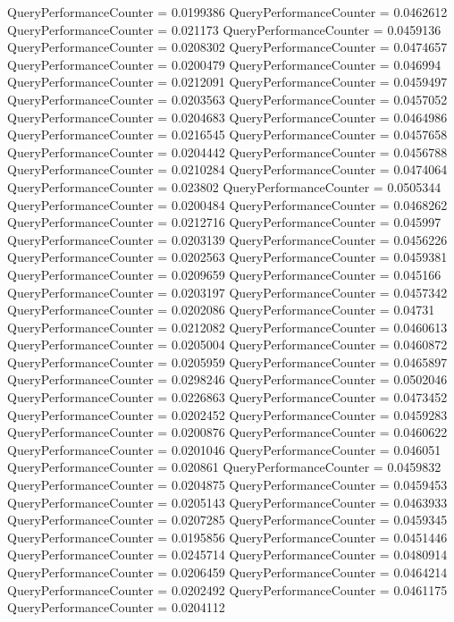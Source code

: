 \documentclass[9pt]{article}
\theoremstyle{plain}
\theoremstyle{definition}
\theoremstyle{remark}
\numberwithin{equation}{section}
\begin{document}
QueryPerformanceCounter  =  0.0199386
QueryPerformanceCounter  =  0.0462612
QueryPerformanceCounter  =  0.021173
QueryPerformanceCounter  =  0.0459136
QueryPerformanceCounter  =  0.0208302
QueryPerformanceCounter  =  0.0474657
QueryPerformanceCounter  =  0.0200479
QueryPerformanceCounter  =  0.046994
QueryPerformanceCounter  =  0.0212091
QueryPerformanceCounter  =  0.0459497
QueryPerformanceCounter  =  0.0203563
QueryPerformanceCounter  =  0.0457052
QueryPerformanceCounter  =  0.0204683
QueryPerformanceCounter  =  0.0464986
QueryPerformanceCounter  =  0.0216545
QueryPerformanceCounter  =  0.0457658
QueryPerformanceCounter  =  0.0204442
QueryPerformanceCounter  =  0.0456788
QueryPerformanceCounter  =  0.0210284
QueryPerformanceCounter  =  0.0474064
QueryPerformanceCounter  =  0.023802
QueryPerformanceCounter  =  0.0505344
QueryPerformanceCounter  =  0.0200484
QueryPerformanceCounter  =  0.0468262
QueryPerformanceCounter  =  0.0212716
QueryPerformanceCounter  =  0.045997
QueryPerformanceCounter  =  0.0203139
QueryPerformanceCounter  =  0.0456226
QueryPerformanceCounter  =  0.0202563
QueryPerformanceCounter  =  0.0459381
QueryPerformanceCounter  =  0.0209659
QueryPerformanceCounter  =  0.045166
QueryPerformanceCounter  =  0.0203197
QueryPerformanceCounter  =  0.0457342
QueryPerformanceCounter  =  0.0202086
QueryPerformanceCounter  =  0.04731
QueryPerformanceCounter  =  0.0212082
QueryPerformanceCounter  =  0.0460613
QueryPerformanceCounter  =  0.0205004
QueryPerformanceCounter  =  0.0460872
QueryPerformanceCounter  =  0.0205959
QueryPerformanceCounter  =  0.0465897
QueryPerformanceCounter  =  0.0298246
QueryPerformanceCounter  =  0.0502046
QueryPerformanceCounter  =  0.0226863
QueryPerformanceCounter  =  0.0473452
QueryPerformanceCounter  =  0.0202452
QueryPerformanceCounter  =  0.0459283
QueryPerformanceCounter  =  0.0200876
QueryPerformanceCounter  =  0.0460622
QueryPerformanceCounter  =  0.0201046
QueryPerformanceCounter  =  0.046051
QueryPerformanceCounter  =  0.020861
QueryPerformanceCounter  =  0.0459832
QueryPerformanceCounter  =  0.0204875
QueryPerformanceCounter  =  0.0459453
QueryPerformanceCounter  =  0.0205143
QueryPerformanceCounter  =  0.0463933
QueryPerformanceCounter  =  0.0207285
QueryPerformanceCounter  =  0.0459345
QueryPerformanceCounter  =  0.0195856
QueryPerformanceCounter  =  0.0451446
QueryPerformanceCounter  =  0.0245714
QueryPerformanceCounter  =  0.0480914
QueryPerformanceCounter  =  0.0206459
QueryPerformanceCounter  =  0.0464214
QueryPerformanceCounter  =  0.0202492
QueryPerformanceCounter  =  0.0461175
QueryPerformanceCounter  =  0.0204112
\end{document}
